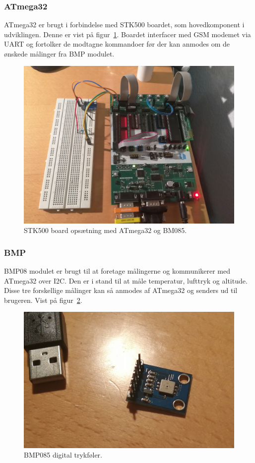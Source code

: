 \subsubsection{ATmega32}
ATmega32 er brugt i forbindelse med STK500 boardet, som hovedkomponent i udviklingen. Denne er vist på figur~\ref{fig:deviceatmege32}. 
Boardet interfacer med GSM modemet via UART og fortolker de modtagne kommandoer før der kan anmodes om de ønskede målinger fra BMP modulet.

\begin{figure}[h]
	\centering
	\includegraphics[width=0.7\linewidth]{figs/device_atmega32.jpg}
	\caption{STK500 board opsætning med ATmega32 og BM085.}
	\label{fig:deviceatmege32}
\end{figure}

\subsubsection{BMP}
BMP08 modulet er brugt til at foretage målingerne og kommunikerer med ATmega32 over I2C. Den er i stand til at måle temperatur, lufttryk og altitude. 
Disse tre forskellige målinger kan så anmodes af ATmega32 og senders ud til brugeren. Vist på figur~\ref{fig:devicebmp}.

\begin{figure}[h]
	\centering
	\includegraphics[width=0.7\linewidth]{figs/device_bmp.jpg}
	\caption{BMP085 digital trykføler.}
	\label{fig:devicebmp}
\end{figure}
